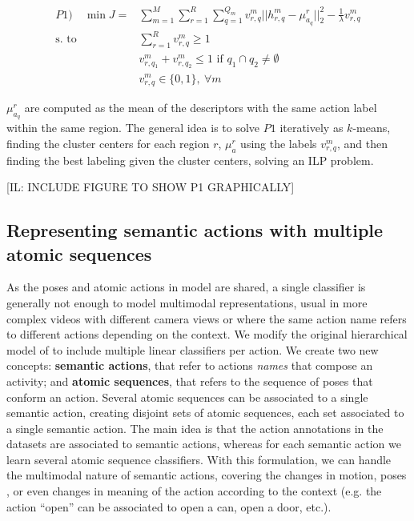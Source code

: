 \begin{equation}
\begin{split}
P1) \quad \min J= &\sum_{m=1}^M  \sum_{r=1}^R \sum_{q=1}^{Q_m}  v_{r,q}^m || h_{r,q}^m - \mu_{a_q}^r||_2^2 -\frac{1}{\lambda} v_{r,q}^m\\ 
 \text{s. to} 
\quad 
& \sum_{r=1}^R v_{r,q}^m \ge 1 \\ 
& v_{r,q_1}^m + v_{r,q_2}^m \le 1 \text{ if } q_1\cap q_2 \neq \emptyset \\  
& v_{r,q}^m \in \{0,1\},~\forall m
\end{split}
\end{equation}
 
$\mu_{a_q}^r$ are computed as the mean of the descriptors with the same action label within the same region. The general idea is to solve $P1$ iteratively as $k$-means,  finding the cluster centers for each region $r$, $\mu_{a}^r$ using the labels $v_{r,q}^m$, and then finding the best labeling given the cluster centers, solving an ILP problem.

[IL: INCLUDE  FIGURE TO SHOW P1 GRAPHICALLY]

\subsection{Representing semantic actions with multiple atomic sequences}

As the poses and atomic actions in \cite{Lillo2014} model are shared, a single classifier is generally not enough to model multimodal representations, usual in more complex videos with different camera views or where the same action name refers to different actions depending on the context. We modify the original hierarchical model of \cite{Lillo2014} to include multiple linear classifiers per action. We create two new concepts: \textbf{semantic actions}, that refer to actions \emph{names} that compose an activity; and \textbf{atomic sequences}, that refers to the sequence of poses that conform an action. Several atomic sequences can be associated to a single semantic action, creating disjoint sets of atomic sequences, each set associated to a single semantic action.  The main idea is that the action annotations in the datasets are associated to semantic actions, whereas for each semantic action we learn several atomic sequence classifiers. With this formulation, we can handle the multimodal nature of semantic actions, covering the changes in motion, poses , or even changes in meaning of the action according to the context (e.g. the action ``open'' can be associated to open a can, open a door, etc.).

